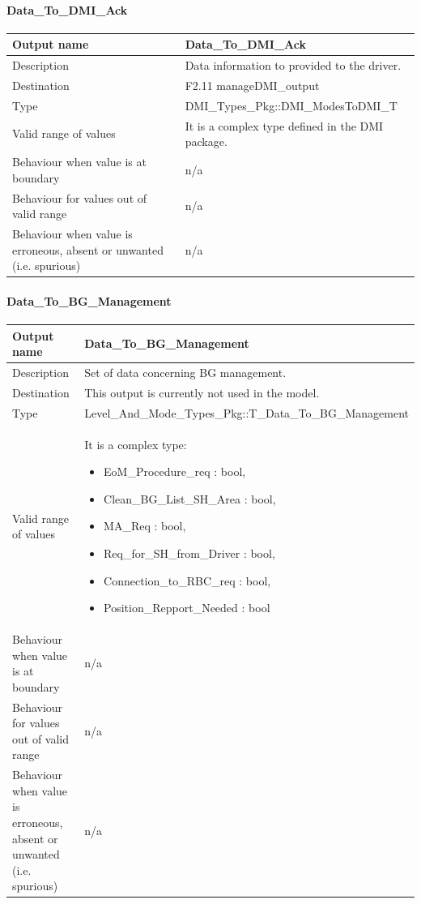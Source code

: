 \paragraph{Data\_To\_DMI\_Ack}

\begin{longtable}{p{}p{}}
\toprule
Output name				& Data\_To\_DMI\_Ack \\
\midrule
Description				& Data information to provided to the driver.  \\
\midrule
Destination				& F2.11 manageDMI\_output  \\ 
\midrule
Type					& DMI\_Types\_Pkg::DMI\_ModesToDMI\_T \\
\midrule
Valid range of values	& It is a complex type defined in the DMI package. \\
\midrule
Behaviour when value is at boundary	& n/a \\ 
\midrule
Behaviour for values out of valid range	& n/a \\ 
\midrule
Behaviour when value is erroneous, absent or unwanted (i.e. spurious) & n/a \\
\bottomrule
\end{longtable}

\paragraph{Data\_To\_BG\_Management}

\begin{longtable}{p{}p{}}
\toprule
Output name				& Data\_To\_BG\_Management \\
\midrule
Description				& Set of data concerning BG management. \\
\midrule
Destination				& This output is currently not used in the model.  \\ 
\midrule
Type					& Level\_And\_Mode\_Types\_Pkg::T\_Data\_To\_BG\_Management \\
\midrule
Valid range of values	& It is a complex type:
\begin{itemize}
\item EoM\_Procedure\_req : bool,
\item  Clean\_BG\_List\_SH\_Area : bool, 
\item MA\_Req : bool,
\item  Req\_for\_SH\_from\_Driver : bool,
\item Connection\_to\_RBC\_req : bool, 
\item Position\_Repport\_Needed : bool
\end{itemize} \\
\midrule
Behaviour when value is at boundary	& n/a \\ 
\midrule
Behaviour for values out of valid range	& n/a \\ 
\midrule
Behaviour when value is erroneous, absent or unwanted (i.e. spurious) & n/a \\
\bottomrule
\end{longtable}



